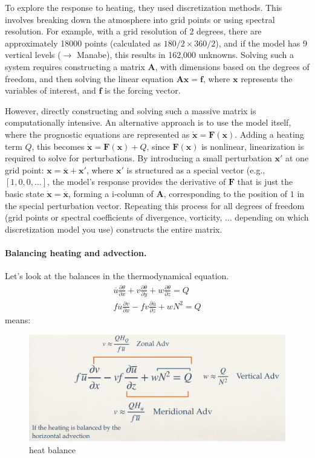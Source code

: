 To explore the response to heating, they used discretization methods. This involves breaking down the atmosphere into grid points or using spectral resolution. For example, with a grid resolution of 2 degrees, there are approximately 18000 points (calculated as $180/2×360/2$), and if the model has 9 vertical levels ($\rightarrow$ Manabe), this results in 162,000 unknowns. Solving such a system requires constructing a matrix $\mathbf{A}$, with dimensions based on the degrees of freedom, and then solving the linear equation $\mathbf{A}\mathbf{x}=\mathbf{f}$, where
$\mathbf{x}$ represents the variables of interest, and $\mathbf{f}$ is the forcing vector.

However, directly constructing and solving such a massive matrix is computationally intensive. An alternative approach is to use the model itself, where the prognostic equations are represented as $\mathbf{\dot{x}}=\mathbf{F(x)}$. Adding a heating term $Q$, this becomes $\mathbf{\dot{x}=F(x)}+Q$, since $\mathbf{F(x)}$ is nonlinear, linearization is required to solve for perturbations. By introducing a small perturbation $\mathbf{x'}$ at one grid point: $\mathbf{x=\overline{x}+x'}$, where $\mathbf{x'}$  is structured as a special vector (e.g., $[1,0,0,\dots]$, the model’s response provides the derivative of $\mathbf{F}$ that is just the basic state $\mathbf{\dot{x}=\dot{\overline{x}}}$, forming a i-column of $\mathbf{A}$, corresponding to the position of $1$ in the special perturbation vector. Repeating this process for all degrees of freedom (grid points or spectral coefficients of divergence, vorticity, ... depending on which discretization model you use) constructs the entire matrix.

\paragraph{Balancing heating and advection.}
Let's look at the balances in the thermodynamical equation.
\begin{align}
	\overline{u}\frac{\partial\theta}{\partial x}+{v}\frac{\partial\overline{\theta}}{\partial y}+w\frac{\partial\overline{\theta}}{\partial z}=Q \\
	f\overline{u}\frac{\partial v}{\partial x}-f{v}\frac{\partial\overline{u}}{\partial z}+wN^2=Q
\end{align}
means:
\begin{figure}[htp!]
	\centering
	\includegraphics[width=0.5\linewidth]{uploads/Screenshot 2024-11-26 104817.png}
	\caption{heat balance}
	\label{fig:enter-label}
\end{figure}

